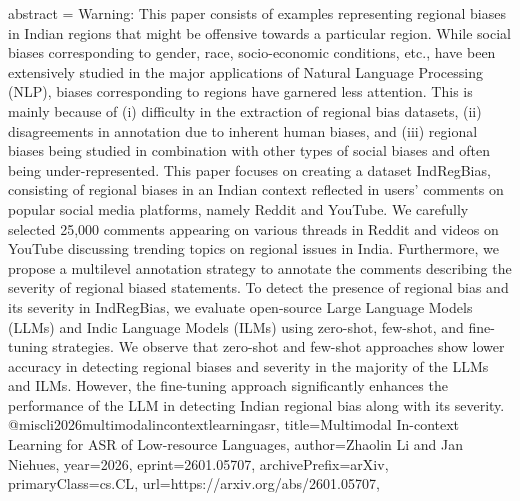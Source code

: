 {      abstract = {Warning: This paper consists of examples representing regional biases in Indian regions that might be offensive towards a particular region.   While social biases corresponding to gender, race, socio-economic conditions, etc., have been extensively studied in the major applications of Natural Language Processing (NLP), biases corresponding to regions have garnered less attention. This is mainly because of (i) difficulty in the extraction of regional bias datasets, (ii) disagreements in annotation due to inherent human biases, and (iii) regional biases being studied in combination with other types of social biases and often being under-represented. This paper focuses on creating a dataset IndRegBias, consisting of regional biases in an Indian context reflected in users' comments on popular social media platforms, namely Reddit and YouTube. We carefully selected 25,000 comments appearing on various threads in Reddit and videos on YouTube discussing trending topics on regional issues in India. Furthermore, we propose a multilevel annotation strategy to annotate the comments describing the severity of regional biased statements. To detect the presence of regional bias and its severity in IndRegBias, we evaluate open-source Large Language Models (LLMs) and Indic Language Models (ILMs) using zero-shot, few-shot, and fine-tuning strategies. We observe that zero-shot and few-shot approaches show lower accuracy in detecting regional biases and severity in the majority of the LLMs and ILMs. However, the fine-tuning approach significantly enhances the performance of the LLM in detecting Indian regional bias along with its severity.}
}@misc{li2026multimodalincontextlearningasr,
      title={Multimodal In-context Learning for ASR of Low-resource Languages}, 
      author={Zhaolin Li and Jan Niehues},
      year={2026},
      eprint={2601.05707},
      archivePrefix={arXiv},
      primaryClass={cs.CL},
      url={https://arxiv.org/abs/2601.05707},
}
